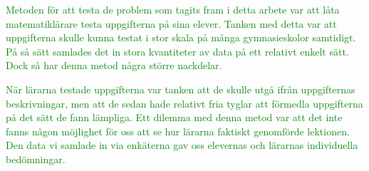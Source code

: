 \textcolor{green}{Metoden för att testa de problem som tagits fram i detta arbete var att låta matematiklärare testa uppgifterna på sina elever. Tanken med detta var att uppgifterna skulle kunna testat i stor skala på många gymnasieskolor samtidigt. På så sätt samlades det in stora kvantiteter av data på ett relativt enkelt sätt. Dock så har denna metod några större nackdelar.}

\textcolor{green}{När lärarna testade uppgifterna var tanken att de skulle utgå ifrån uppgifternas beskrivningar, men att de sedan hade relativt fria tyglar att förmedla uppgifterna på det sätt de fann lämpliga. Ett dilemma med denna metod var att det inte fanns någon möjlighet för oss att se hur lärarna faktiskt genomförde lektionen. Den data vi samlade in via enkäterna gav oss elevernas och lärarnas individuella bedömningar.}

%
% 
%
%